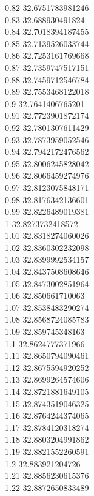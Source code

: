{0.82	32.6751783981246\\
0.83	32.688930491824\\
0.84	32.7018394187455\\
0.85	32.7139526033744\\
0.86	32.7253161769668\\
0.87	32.7359747517151\\
0.88	32.7459712546784\\
0.89	32.7553468122018\\
0.9	32.7641406765201\\
0.91	32.7723901872174\\
0.92	32.7801307611429\\
0.93	32.7873959052546\\
0.94	32.7942172476562\\
0.95	32.8006245828042\\
0.96	32.8066459274976\\
0.97	32.8123075848171\\
0.98	32.8176342136601\\
0.99	32.8226489019381\\
1	32.8273732418572\\
1.01	32.8318274060026\\
1.02	32.8360302232098\\
1.03	32.8399992534157\\
1.04	32.8437508608646\\
1.05	32.8473002851964\\
1.06	32.850661710063\\
1.07	32.8538483290274\\
1.08	32.8568724085783\\
1.09	32.859745348163\\
1.1	32.8624777371966\\
1.11	32.8650794090461\\
1.12	32.8675594920252\\
1.13	32.8699264574606\\
1.14	32.8721881649105\\
1.15	32.8743519046325\\
1.16	32.8764244374065\\
1.17	32.8784120318274\\
1.18	32.8803204991862\\
1.19	32.8821552260591\\
1.2	32.883921204726\\
1.21	32.8856230615376\\
1.22	32.8872650833489\\
}
